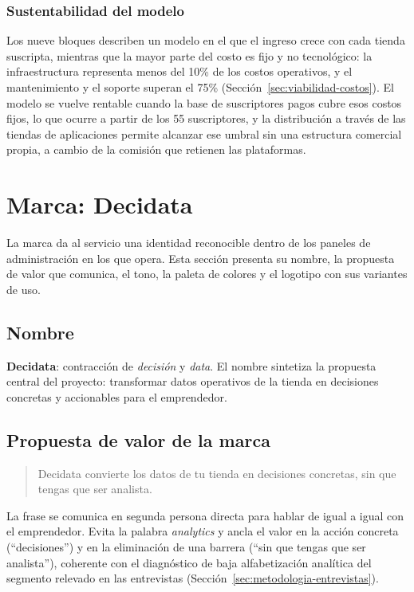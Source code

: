 \subsubsection*{Sustentabilidad del modelo}

Los nueve bloques describen un modelo en el que el ingreso crece con cada tienda suscripta, mientras que la mayor parte del costo es fijo y no tecnológico: la infraestructura representa menos del 10\% de los costos operativos, y el mantenimiento y el soporte superan el 75\% (Sección~\ref{sec:viabilidad-costos}). El modelo se vuelve rentable cuando la base de suscriptores pagos cubre esos costos fijos, lo que ocurre a partir de los 55 suscriptores, y la distribución a través de las tiendas de aplicaciones permite alcanzar ese umbral sin una estructura comercial propia, a cambio de la comisión que retienen las plataformas.

\section{Marca: Decidata}
\label{sec:marca-decidata}

La marca da al servicio una identidad reconocible dentro de los paneles de administración en los que opera. Esta sección presenta su nombre, la propuesta de valor que comunica, el tono, la paleta de colores y el logotipo con sus variantes de uso.

\subsection{Nombre}
\label{sec:marca-nombre}

\textbf{Decidata}: contracción de \emph{decisión} y \emph{data}. El nombre sintetiza la propuesta central del proyecto: transformar datos operativos de la tienda en decisiones concretas y accionables para el emprendedor.

\subsection{Propuesta de valor de la marca}
\label{sec:marca-propuesta}

\begin{quote}
Decidata convierte los datos de tu tienda en decisiones concretas, sin que tengas que ser analista.
\end{quote}

La frase se comunica en segunda persona directa para hablar de igual a igual con el emprendedor. Evita la palabra \emph{analytics} y ancla el valor en la acción concreta (``decisiones'') y en la eliminación de una barrera (``sin que tengas que ser analista''), coherente con el diagnóstico de baja alfabetización analítica del segmento relevado en las entrevistas (Sección~\ref{sec:metodologia-entrevistas}).

